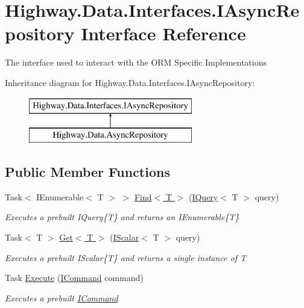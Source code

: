 \hypertarget{interface_highway_1_1_data_1_1_interfaces_1_1_i_async_repository}{\section{Highway.\-Data.\-Interfaces.\-I\-Async\-Repository Interface Reference}
\label{interface_highway_1_1_data_1_1_interfaces_1_1_i_async_repository}
}


The interface used to interact with the O\-R\-M Specific Implementations  


Inheritance diagram for Highway.\-Data.\-Interfaces.\-I\-Async\-Repository\-:\begin{figure}[H]
\begin{center}
\leavevmode
\includegraphics[height=2.000000cm]{interface_highway_1_1_data_1_1_interfaces_1_1_i_async_repository}
\end{center}
\end{figure}
\subsection*{Public Member Functions}
\begin{DoxyCompactItemize}
\item 
Task$<$ I\-Enumerable$<$ T $>$ $>$ \hyperlink{interface_highway_1_1_data_1_1_interfaces_1_1_i_async_repository_adf81905d686e44b115548921a7d6d72d}{Find$<$ T $>$} (\hyperlink{interface_highway_1_1_data_1_1_interfaces_1_1_i_query-g}{I\-Query}$<$ T $>$ query)
\begin{DoxyCompactList}\small\item\em Executes a prebuilt I\-Query\{\-T\} and returns an I\-Enumerable\{\-T\} \end{DoxyCompactList}\item 
Task$<$ T $>$ \hyperlink{interface_highway_1_1_data_1_1_interfaces_1_1_i_async_repository_a7eed1d89c1104a467bfdc12cb0de3133}{Get$<$ T $>$} (\hyperlink{interface_highway_1_1_data_1_1_interfaces_1_1_i_scalar-g}{I\-Scalar}$<$ T $>$ query)
\begin{DoxyCompactList}\small\item\em Executes a prebuilt I\-Scalar\{\-T\} and returns a single instance of {\itshape T}  \end{DoxyCompactList}\item 
Task \hyperlink{interface_highway_1_1_data_1_1_interfaces_1_1_i_async_repository_a5f396f5c1aa1b9e3eced829bf736a4ab}{Execute} (\hyperlink{interface_highway_1_1_data_1_1_interfaces_1_1_i_command}{I\-Command} command)
\begin{DoxyCompactList}\small\item\em Executes a prebuilt \hyperlink{interface_highway_1_1_data_1_1_interfaces_1_1_i_command}{I\-Command} \end{DoxyCompactList}\end{DoxyCompactItemize}
